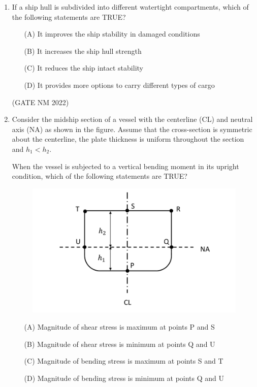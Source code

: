 \documentclass[journal,12pt,onecolumn]{IEEEtran}
\theoremstyle{remark}
\begin{document}
\begin{enumerate}
\begin{multicols}{4}
\end{multicols}

\hfill(GATE NM 2022)



\item  If a ship hull is subdivided into different watertight compartments, which of the following statements are TRUE?

\begin{enumerate}
    \item[(A)] It improves the ship stability in damaged conditions
    \item[(B)] It increases the ship hull strength
    \item[(C)] It reduces the ship intact stability
    \item[(D)] It provides more options to carry different types of cargo
\end{enumerate}

\hfill(GATE NM 2022)









\item  Consider the midship section of a vessel with the centerline (CL) and neutral axis (NA) as shown in the figure.  
Assume that the cross-section is symmetric about the centerline, the plate thickness is uniform throughout the section and $h_1 < h_2$.  

When the vessel is subjected to a vertical bending moment in its upright condition, which of the following statements are TRUE?

\begin{figure}[h]
	\centering
	\includegraphics[width=0.6\columnwidth]{fig7}
	\caption{}
	\label{fig:placeholder}
\end{figure}

\begin{enumerate}
    \item[(A)] Magnitude of shear stress is maximum at points P and S
    \item[(B)] Magnitude of shear stress is minimum at points Q and U
    \item[(C)] Magnitude of
	    bending stress is maximum at points S and T
    \item[(D)] Magnitude of bending stress is minimum at points Q and U
\end{enumerate}


\end{enumerate}
\end{document}
